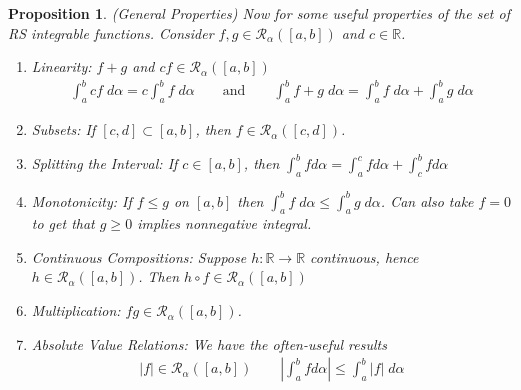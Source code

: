 \documentclass[12pt]{book}
\numberwithin{equation}{section} %
\theoremstyle{plain}
\newtheorem{prop}[thm]{Proposition}
\theoremstyle{definition}
\theoremstyle{remark}
\newcommand{\sR}{\mathscr{R}}
\begin{document}
\begin{prop}\emph{(General Properties)}
Now for some useful properties of the set of RS integrable functions.
Consider $f,g \in \mathscr{R}_\alpha([a,b])$ and $c \in \mathbb{R}$.
\begin{enumerate}[label=\emph{(\roman*)}]
    \item \emph{Linearity}: $f+g$
      and $cf \in \mathscr{R}_\alpha([a,b])$
      \begin{align*}
        \int^b_a cf \; d\alpha = c \int^b_a f\; d\alpha
          \qquad \text{and} \qquad
          \int^b_a f+g\; d\alpha = \int^b_a f \;d\alpha +
          \int^b_a g\; d\alpha
      \end{align*}
    \item \emph{Subsets}: If $[c,d]\subset[a,b]$,
      then $f \in \mathscr{R}_\alpha([c,d])$.
    \item \emph{Splitting the Interval}: If $c \in [a,b]$, then
      $\int^b_a f d\alpha = \int^c_a f d\alpha + \int^b_c f d\alpha$
    \item \emph{Monotonicity}:
      If $f\leq g$ on $[a,b]$ then
      $\int^b_a f \; d\alpha \leq \int^b_a g \; d\alpha$.
      Can also take $f=0$ to get that $g\geq 0$ implies nonnegative
      integral.
    \item \emph{Continuous Compositions}:
      Suppose $h: \mathbb{R}\rightarrow\mathbb{R}$ continuous, hence
      $h\in \sR_\alpha([a,b])$.
      Then $h \circ f\in\mathscr{R}_\alpha([a,b])$
    \item \emph{Multiplication}:
      $fg\in\mathscr{R}_\alpha([a,b])$.
    \item \emph{Absolute Value Relations}:
      We have the often-useful results
      \begin{align*}
        |f| \in \mathscr{R}_\alpha([a,b])
        \qquad
        \left\lvert\int^b_a f d\alpha \right\rvert
        \leq \int^b_a |f| \; d\alpha
      \end{align*}
\end{enumerate}
\end{prop}
\end{document}
